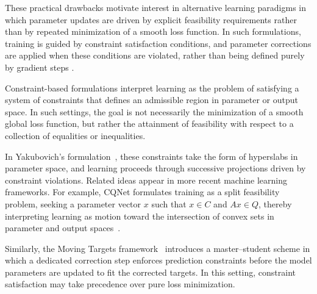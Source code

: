 \documentclass[a4paper,fleqn]{cas-sc}
\begin{document}

These practical drawbacks motivate interest in alternative learning paradigms in which parameter updates are driven by explicit feasibility requirements rather than by repeated minimization of a smooth loss function.
In such formulations, training is guided by constraint satisfaction conditions,
and parameter corrections are applied when these conditions are violated, rather than being defined purely by gradient steps \cite{detassis2021teachingolddognew, peters2023cqnetconvexgeometricinterpretationconstraining}.

Constraint-based formulations interpret learning as the problem of satisfying a system of constraints that defines an admissible region in parameter or output space. In such settings, the goal is not necessarily the minimization of a smooth global loss function, but rather the attainment of feasibility with respect to a collection of equalities or inequalities.

In Yakubovich’s formulation~\cite{Yakubovich1966Recurrent}, these constraints take the form of hyperslabs in parameter space, and learning proceeds through successive projections driven by constraint violations. Related ideas appear in more recent machine learning frameworks. For example, CQNet formulates training as a split feasibility problem, seeking a parameter vector $x$ such that $x \in C$ and $Ax \in Q$, thereby interpreting learning as motion toward the intersection of convex sets in parameter and output spaces~\cite{peters2023cqnetconvexgeometricinterpretationconstraining}. 

Similarly, the Moving Targets framework~\cite{detassis2021teachingolddognew} introduces a master–student scheme in which a dedicated correction step enforces prediction constraints before the model parameters are updated to fit the corrected targets. In this setting, constraint satisfaction may take precedence over pure loss minimization.
\end{document}
